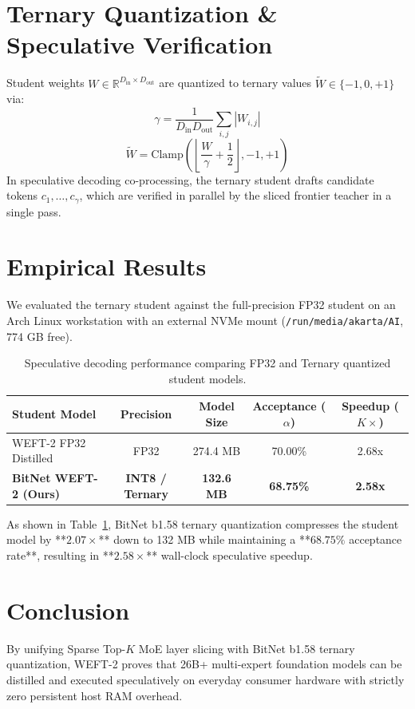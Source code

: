 \documentclass[11pt,a4paper]{article}
\begin{document}
\section{Ternary Quantization \& Speculative Verification}
Student weights $W \in \mathbb{R}^{D_{\text{in}} \times D_{\text{out}}}$ are quantized to ternary values $\widetilde{W} \in \{-1, 0, +1\}$ via:
\begin{equation}
\gamma = \frac{1}{D_{\text{in}} D_{\text{out}}} \sum_{i,j} |W_{i,j}|
\end{equation}
\begin{equation}
\widetilde{W} = \text{Clamp}\left(\left\lfloor \frac{W}{\gamma} + \frac{1}{2} \right\rfloor, -1, +1\right)
\end{equation}
In speculative decoding co-processing, the ternary student drafts candidate tokens $c_1, \dots, c_\gamma$, which are verified in parallel by the sliced frontier teacher in a single pass.

\section{Empirical Results}
We evaluated the ternary student against the full-precision FP32 student on an Arch Linux workstation with an external NVMe mount (\texttt{/run/media/akarta/AI}, 774 GB free).

\begin{table}[h]
\centering
\small
\begin{tabular}{lcccc}
\toprule
\textbf{Student Model} & \textbf{Precision} & \textbf{Model Size} & \textbf{Acceptance ($\alpha$)} & \textbf{Speedup ($K\times$)} \\
\midrule
WEFT-2 FP32 Distilled & FP32 & 274.4 MB & 70.00\% & 2.68x \\
\textbf{BitNet WEFT-2 (Ours)} & \textbf{INT8 / Ternary} & \textbf{132.6 MB} & \textbf{68.75\%} & \textbf{2.58x} \\
\bottomrule
\end{tabular}
\caption{Speculative decoding performance comparing FP32 and Ternary quantized student models.}
\label{tab:ternary_eval}
\end{table}

As shown in Table~\ref{tab:ternary_eval}, BitNet b1.58 ternary quantization compresses the student model by **$2.07\times$** down to 132 MB while maintaining a **$68.75\%$ acceptance rate**, resulting in **$2.58\times$** wall-clock speculative speedup.

\section{Conclusion}
By unifying Sparse Top-$K$ MoE layer slicing with BitNet b1.58 ternary quantization, WEFT-2 proves that 26B+ multi-expert foundation models can be distilled and executed speculatively on everyday consumer hardware with strictly zero persistent host RAM overhead.
\end{document}
